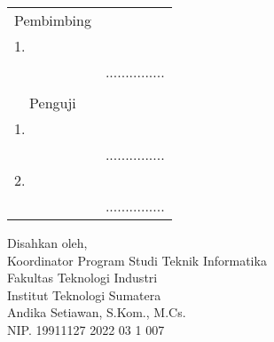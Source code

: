 \begin{center}
	\justify
    \setlength{\tabcolsep}{0pt}
    \begin{tabular}{ m{0.5cm}  m{} >{\centering\arraybackslash}m{}}
        \multicolumn{2}{c}{\hspace*{70pt}Pembimbing} & \multicolumn{1}{c}{} \\[2pt]
		1. & \printnamadosbinga & \\
		 & \printnipdosbinga & ............... \\%
		 & \\
		\multicolumn{2}{c}{\hspace*{70pt}Penguji} & \multicolumn{1}{c}{} \\[2pt]
		1. & \printnamapengujia & \\
		& \printnippengujia & ............... \\[4pt]
		2. & \printnamapengujib & \\
		& \printnippengujib & ............... \\
    \end{tabular}

	\begin{center}
		\fontsize{10pt}{10pt}
        \vspace{0.45cm}
		Disahkan oleh,\\
		Koordinator Program Studi Teknik Informatika\\
		Fakultas Teknologi Industri\\
		Institut Teknologi Sumatera
		\vspace{1.8cm}\\
		Andika Setiawan, S.Kom., M.Cs. \\ %
		NIP. 19911127 2022 03 1 007 \\
	\end{center}
	\vfill

\end{center}
\clearpage